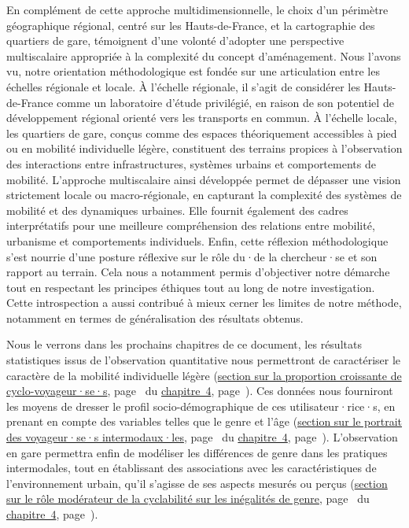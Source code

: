 \begin{refsegment}
En complément de cette approche multidimensionnelle, le choix d’un périmètre géographique régional, centré sur les Hauts-de-France, et la cartographie des quartiers de gare, témoignent d’une volonté d’adopter une perspective multiscalaire appropriée à la complexité du concept d'aménagement. Nous l'avons vu, notre orientation méthodologique est fondée sur une articulation entre les échelles régionale et locale. À l’échelle régionale, il s’agit de considérer les Hauts-de-France comme un laboratoire d’étude privilégié, en raison de son potentiel de développement régional orienté vers les transports en commun. À l’échelle locale, les quartiers de gare, conçus comme des espaces théoriquement accessibles à pied ou en mobilité individuelle légère, constituent des terrains propices à l’observation des interactions entre infrastructures, systèmes urbains et comportements de mobilité. L’approche multiscalaire ainsi développée permet de dépasser une vision strictement locale ou macro-régionale, en capturant la complexité des systèmes de mobilité et des dynamiques urbaines. Elle fournit également des cadres interprétatifs pour une meilleure compréhension des relations entre mobilité, urbanisme et comportements individuels. Enfin, cette réflexion méthodologique s’est nourrie d’une posture réflexive sur le rôle du·de la chercheur·se et son rapport au terrain. Cela nous a notamment permis d’objectiver notre démarche tout en respectant les principes éthiques tout au long de notre investigation. Cette introspection a aussi contribué à mieux cerner les limites de notre méthode, notamment en termes de généralisation des résultats obtenus.%

Nous le verrons dans les prochains chapitres de ce document, les résultats statistiques issus de l’observation quantitative nous permettront de caractériser le caractère  de la mobilité individuelle légère (\hyperref[chap4:proportion-croissante-voyageurs-intermodaux]{section sur la proportion croissante de cyclo-voyageur·se·s}, page~\pageref{chap4:proportion-croissante-voyageurs-intermodaux} du \hyperref[chap4:titre]{chapitre~4}, page~\pageref{chap4:titre}). Ces données nous fourniront les moyens de dresser le profil socio-démographique de ces utilisateur·rice·s, en prenant en compte des variables telles que le genre et l’âge (\hyperref[chap4:demographie]{section sur le portrait des voyageur·se·s intermodaux·les}, page~\pageref{chap4:demographie} du \hyperref[chap4:titre]{chapitre~4}, page~\pageref{chap4:titre}). L'observation en gare permettra enfin de modéliser les différences de genre dans les pratiques intermodales, tout en établissant des associations avec les caractéristiques de l’environnement urbain, qu’il s’agisse de ses aspects mesurés ou perçus (\hyperref[section-chap4:cyclabilite-genre]{section sur le rôle modérateur de la cyclabilité sur les inégalités de genre}, page~\pageref{section-chap4:cyclabilite-genre} du \hyperref[chap4:titre]{chapitre~4}, page~\pageref{chap4:titre}).%


\end{refsegment}
